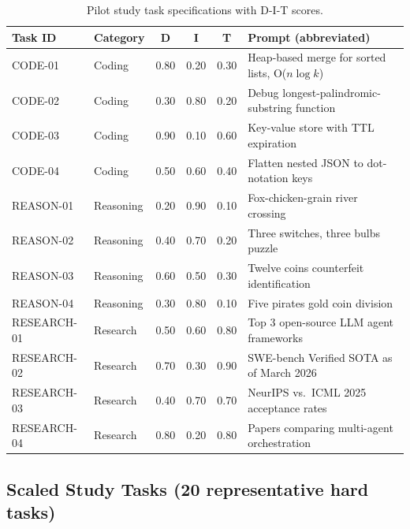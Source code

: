\begin{table}[h]
\centering
\caption{Pilot study task specifications with D-I-T scores.}
\label{tab:pilot_tasks}
\scriptsize
\begin{tabular}{llcccl}
\toprule
\textbf{Task ID} & \textbf{Category} & \textbf{D} & \textbf{I} & \textbf{T} & \textbf{Prompt (abbreviated)} \\
\midrule
CODE-01 & Coding & 0.80 & 0.20 & 0.30 & Heap-based merge for sorted lists, O($n \log k$) \\
CODE-02 & Coding & 0.30 & 0.80 & 0.20 & Debug longest-palindromic-substring function \\
CODE-03 & Coding & 0.90 & 0.10 & 0.60 & Key-value store with TTL expiration \\
CODE-04 & Coding & 0.50 & 0.60 & 0.40 & Flatten nested JSON to dot-notation keys \\
REASON-01 & Reasoning & 0.20 & 0.90 & 0.10 & Fox-chicken-grain river crossing \\
REASON-02 & Reasoning & 0.40 & 0.70 & 0.20 & Three switches, three bulbs puzzle \\
REASON-03 & Reasoning & 0.60 & 0.50 & 0.30 & Twelve coins counterfeit identification \\
REASON-04 & Reasoning & 0.30 & 0.80 & 0.10 & Five pirates gold coin division \\
RESEARCH-01 & Research & 0.50 & 0.60 & 0.80 & Top 3 open-source LLM agent frameworks \\
RESEARCH-02 & Research & 0.70 & 0.30 & 0.90 & SWE-bench Verified SOTA as of March 2026 \\
RESEARCH-03 & Research & 0.40 & 0.70 & 0.70 & NeurIPS vs.\ ICML 2025 acceptance rates \\
RESEARCH-04 & Research & 0.80 & 0.20 & 0.80 & Papers comparing multi-agent orchestration \\
\bottomrule
\end{tabular}
\end{table}

\subsection{Scaled Study Tasks (20 representative hard tasks)}

